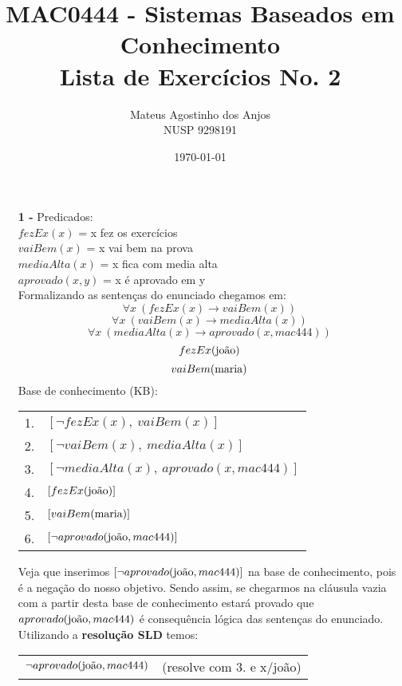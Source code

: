 \documentclass[12pt]{article}
\title{MAC0444 - Sistemas Baseados em Conhecimento \\
Lista de Exercícios No. 2
}
\author{Mateus Agostinho dos Anjos\\NUSP 9298191}
\date{\today}
\begin{document}
	\maketitle
	\begin{itemize}
		\item[\textbf{1 -}]
			\hfill\newline
			Predicados:\\
			$fezEx(x)$ = x fez os exercícios\\
			$vaiBem(x)$ = x vai bem na prova\\
			$mediaAlta(x)$ = x fica com media alta\\
			$aprovado(x, y)$ = x é aprovado em y \\
			\newline
			Formalizando as sentenças do enunciado chegamos em:\\
			$$\forall x \ (fezEx(x) \rightarrow vaiBem(x))$$
			$$\forall x \ (vaiBem(x) \rightarrow mediaAlta(x))$$
			$$\forall x \ (mediaAlta(x) \rightarrow aprovado(x, mac444))$$
			$$fezEx(\textnormal{joão})$$
			$$vaiBem(\textnormal{maria})$$
			Base de conhecimento (KB):\\
			\begin{center}
				\begin{tabular}{c l}
				1. & $[\neg fezEx(x), \ vaiBem(x)]$\\
				2. & $[\neg vaiBem(x), \ mediaAlta(x)]$\\
				3. & $[\neg mediaAlta(x), \ aprovado(x, mac444)] $\\
				4. & $[fezEx(\textnormal{joão})]$\\
				5. & $[vaiBem(\textnormal{maria})]$\\
				6. & $[\neg aprovado(\textnormal{joão}, mac444)]$\\
				\end{tabular}
			\end{center}
			Veja que inserimos $[\neg aprovado(\textnormal{joão}, mac444)]$ na base de 
			conhecimento, pois	é a negação do nosso objetivo. Sendo assim, se chegarmos na 
			cláusula vazia com a partir desta base de conhecimento estará provado que 
			$aprovado(\textnormal{joão},	 mac444)$ é consequência lógica das sentenças do
			 enunciado.\\
			\newline
			Utilizando a \textbf{resolução SLD} temos:\\
			\begin{center}
				\begin{tabular}{c c}
					$\neg aprovado(\textnormal{joão}, mac444)$ & (resolve com 3. e x/joão)\\

\end{tabular}
\end{center}
\end{itemize}
\end{document}
